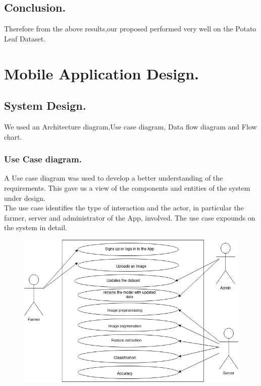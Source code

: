 \documentclass[11pt]{report}
\begin{document}
\section{Conclusion.}
Therefore from the above results,our proposed performed very well on the Potato Leaf Dataset.\\



\newpage
\chapter{Mobile Application Design.}


\section{System Design.}
We used an Architecture diagram,Use case diagram, Data flow diagram and Flow chart.\\

\subsection{Use Case diagram.}
A Use case diagram was used to develop a better understanding of the requirements. This gave us a view of the components and entities of the system under design.\\
The use case identifies the type of interaction and the actor, in particular the farmer, server and administrator of the App, involved.
The use case expounds on the system in detail.\\

\begin{figure}[h]
	\centerline{\small 
		\includegraphics[height=0.3\textheight]  {usecase}}
\end{figure}
\end{document}
